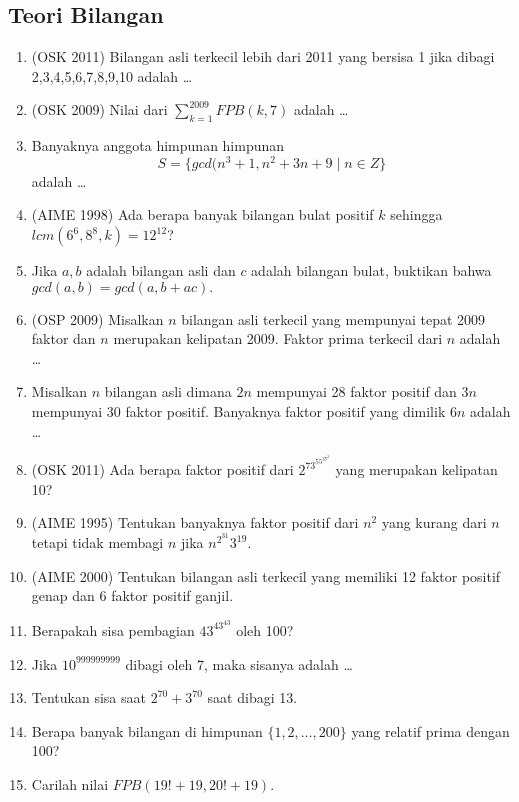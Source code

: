 \subsection{Teori Bilangan}
    \begin{enumerate}
        \item (OSK 2011) Bilangan asli terkecil lebih dari 2011 yang bersisa 1 jika dibagi 2,3,4,5,6,7,8,9,10 adalah \dots
        
        \item (OSK 2009) Nilai dari $\sum_{k=1}^{2009} FPB(k,7)$ adalah \dots
        
        \item Banyaknya anggota himpunan himpunan 
        $$S = \{gcd(n^3+1,n^2+3n+9 \mid n \in Z\}$$
        adalah \dots
        
        \item (AIME 1998) Ada berapa banyak bilangan bulat positif $k$ sehingga $lcm(6^6,8^8,k)=12^{12}$?
        
        \item Jika $a,b$ adalah bilangan asli dan $c$ adalah bilangan bulat, buktikan bahwa $gcd(a,b)=gcd(a,b+ac).$
        
        \item (OSP 2009) Misalkan $n$ bilangan asli terkecil yang mempunyai tepat 2009 faktor dan $n$ merupakan kelipatan 2009. Faktor prima terkecil dari $n$ adalah \dots
        
        \item Misalkan $n$ bilangan asli dimana $2n$ mempunyai 28 faktor positif dan $3n$ mempunyai 30 faktor positif. Banyaknya faktor positif yang dimilik $6n$ adalah \dots
        
        \item (OSK 2011) Ada berapa faktor positif dari $2^73^55^37^2$ yang merupakan kelipatan 10?
        
        \item (AIME 1995) Tentukan banyaknya faktor positif dari $n^2$ yang kurang dari $n$ tetapi tidak membagi $n$ jika $n^{2^{31}}3^{19}.$
        
        \item (AIME 2000) Tentukan bilangan asli terkecil yang memiliki 12 faktor positif genap dan $6$ faktor positif ganjil.
        
        \item Berapakah sisa pembagian $43^{43^{43}}$ oleh 100?
        
        \item Jika $10^{999999999}$ dibagi oleh 7, maka sisanya adalah \dots
        
        \item Tentukan sisa saat $2^{70}+3^{70}$ saat dibagi 13.
        
        \item Berapa banyak bilangan di himpunan $\{1,2,\dots,200\}$ yang relatif prima dengan 100?
        
        \item Carilah nilai $FPB(19!+19,20!+19).$

 \end{enumerate}
 
